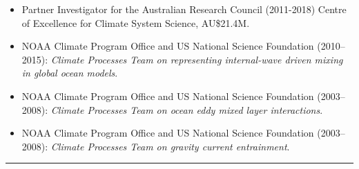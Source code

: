\documentclass{article}
\begin{document}
\begin{itemize}[leftmargin=*]
\item Partner Investigator for the Australian Research Council (2011-2018) Centre of Excellence for Climate System Science, AU\$21.4M.
  
\item NOAA Climate Program Office and US National Science Foundation (2010--2015): {\it Climate Processes Team on representing internal-wave driven mixing in global ocean models}.

\item NOAA Climate Program Office and US National Science Foundation (2003--2008): {\it Climate Processes Team on ocean eddy mixed layer interactions}.

\item NOAA Climate Program Office and US National Science Foundation (2003--2008): {\it Climate Processes Team on gravity current entrainment}.

\end{itemize}



\noindent\rule{\textwidth}{1pt}
\vspace{-1cm}
%

\end{document}
